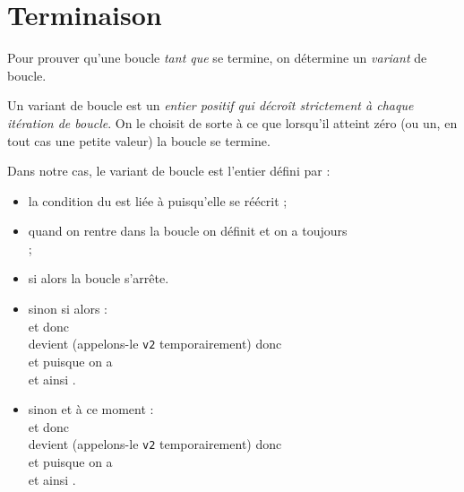 \section{Terminaison}

Pour prouver qu'une boucle \textit{tant que} se termine, on détermine un \textit{variant} de boucle.

\begin{definition}[]
Un variant de boucle est un \textit{entier positif qui décroît strictement à chaque itération de boucle}. On le choisit de sorte à ce que lorsqu'il atteint zéro (ou un, en tout cas une petite valeur) la boucle se termine.\\
\end{definition}

Dans notre cas, le variant de boucle est l'entier  défini par  :
\begin{itemize}
    \item   la condition du  est liée à  puisqu'elle se réécrit ;
    \item   quand on rentre dans la boucle on définit  et on a toujours \\
    ;
    \item   si  alors la boucle s'arrête.
        
    \item   sinon si  alors :\\
             et donc\\
             devient (appelons-le \texttt{v2} temporairement)  donc\\
             et puisque  on a\\
             et ainsi .
    \item   sinon  et à ce moment :\\
             et donc\\
             devient (appelons-le \texttt{v2} temporairement)  donc\\
             et puisque  on a\\
             et ainsi .         
\end{itemize}

